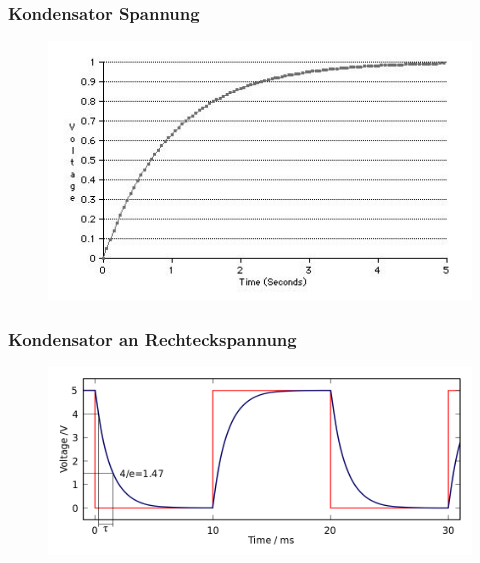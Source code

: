 \begin{frame}
  \frametitle{Kondensator Spannung}
  \begin{center}
    \begin{figure}
      \includegraphics[width=1\textwidth,height=.75\textheight,keepaspectratio]{a03/Capacitor_Charge_Graph.jpg}
    \end{figure}
  \end{center}
\end{frame}

\begin{frame}
  \frametitle{Kondensator an Rechteckspannung}
  \begin{center}
    \begin{figure}
      \includegraphics[width=1\textwidth,height=.75\textheight,keepaspectratio]{a03/Capacitor_Square_wave_charge-discharge.png}
    \end{figure}
  \end{center}
\end{frame}

